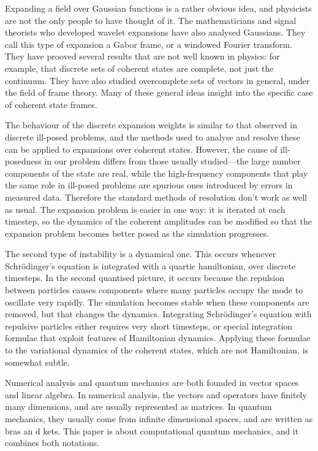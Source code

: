 Expanding a field over Gaussian functions is a rather obvious idea, and physicists are not the only people to have thought of it.  The mathematicians and signal theorists who developed wavelet expansions have also analysed Gaussians.  They call this type of expansion a Gabor frame, or a windowed Fourier transform.  They have prooved several results that are not well known in physics: for example, that discrete sets of coherent states are complete, not just the continuum.  They have also studied overcomplete sets of vectors in general, under the field of frame theory.  Many of these general ideas insight into the specific case of coherent state frames.

The behaviour of the discrete expansion weights is similar to that observed in discrete ill-posed problems, and the methods used to analyse and resolve these can be applied to expansions over coherent states.  However, the cause of ill-posedness in our problem differs from those usually studied—the large number components of the state are real, while the high-frequency components that play the same role in ill-posed problems are spurious ones introduced by errors in measured data.  Therefore the standard methods of resolution don't work as well as usual.  The expansion problem is easier in one way: it is iterated at each timestep, so the dynamics of the coherent amplitudes can be modified so that the expansion problem becomes better posed as the simulation progresses.

The second type of instability is a dynamical one.  This occurs whenever Schrödinger's equation is integrated with a quartic hamiltonian, over discrete timesteps.  In the second quantised picture, it occurs because the repulsion between particles causes components where many particles occupy the mode to oscillate very rapidly.  The simulation becomes stable when these components are removed, but that changes the dynamics.  Integrating Schrödinger's equation with repulsive particles either requires very short timesteps, or special integration formulae that exploit features of Hamiltonian dynamics.  Applying these formulae to the variational dynamics of the coherent states, which are not Hamiltonian, is somewhat subtle.



Numerical analysis and quantum mechanics are both founded in vector spaces and linear algebra.  In numerical analysis, the vectors and operators have finitely many dimensions, and are usually represented as matrices.  In quantum mechanics, they usually come from infinite dimensional spaces, and are written as bras an d kets.  This paper is about computational quantum mechanics, and it combines both notations.

